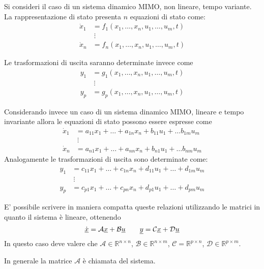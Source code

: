 	\begin{esempio}{}
		Si consideri il caso di un sistema dinamico MIMO, non lineare, tempo variante. La rappresentazione di stato presenta $n$ equazioni di stato come:
		\begin{align*}
			\dot x_1 & = f_1 (x_1,\dots,x_n, u_1,\dots, u_m, t) \\ & \ \vdots \\
			\dot x_n & = f_n (x_1,\dots,x_n, u_1,\dots, u_m, t) 
		\end{align*}
		
		Le trasformazioni di uscita saranno determinate invece come
		\begin{align*}
		y_1 & = g_1 (x_1,\dots,x_n, u_1,\dots, u_m, t) \\ & \ \vdots \\
		y_p & = g_p (x_1,\dots,x_n, u_1,\dots, u_m, t) 
		\end{align*}
		
		
		\vspace{3mm} \noindent
		Considerando invece un caso di un sistema dinamico MIMO, lineare e tempo invariante allora le equazioni di stato possono essere espresse come
		\begin{align*}
			\dot x_1 & = a_{11} x_1+\dots +a_{1n}x_n + b_{11}u_1 + \dots b_{1m}u_m \\ & \ \vdots \\
			\dot x_n & = a_{n1} x_1+\dots +a_{nn}x_n + b_{n1}u_1 + \dots b_{nm}u_m 
		\end{align*}
		Analogamente le trasformazioni di uscita sono determinate come:
		\begin{align*}
		y_1 & = c_{11} x_1+\dots +c_{1n}x_n + d_{11}u_1 + \dots +d_{1m}u_m \\ & \ \vdots \\
		y_p & = c_{p1} x_1+\dots +c_{pn}x_n + d_{p1}u_1 + \dots + d_{pm}u_m 
		\end{align*}
		
		E' possibile scrivere in maniera compatta queste relazioni utilizzando le matrici in quanto il sistema è lineare, ottenendo
		\[ \dot{\underline{x}} = \mathcal A \underline{x} + \mathcal{B} \underline{u} \qquad \underline{y} = \mathcal C\underline{x} + \mathcal D \underline{u} \]
		In questo caso deve valere che $\mathcal A\in \mathds R^{n\times n}$, $\mathcal B \in \mathds R^{n\times m}$, $\mathcal C = \mathds R^{p\times n}$, $\mathcal D\in\mathds R^{p\times m}$.
	\end{esempio}
	 
	 In generale la matrice $\mathcal A$ è chiamata  del sistema.
 	
